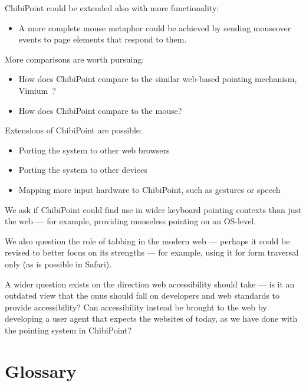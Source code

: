 \documentclass[11pt,openright,a4paper]{report}
\begin{document}
ChibiPoint could be extended also with more functionality:
\begin{itemize}
\item A more complete mouse metaphor could be achieved by sending mouseover events to page elements that respond to them.
\end{itemize}

More comparisons are worth pursuing:
\begin{itemize}
\item How does ChibiPoint compare to the similar web-based pointing mechanism, Vimium~\cite{vimium}?
\item How does ChibiPoint compare to the mouse?
\end{itemize}

Extensions of ChibiPoint are possible:
\begin{itemize}
\item Porting the system to other web browsers
\item Porting the system to other devices
\item Mapping more input hardware to ChibiPoint, such as gestures or speech
\end{itemize}

We ask if ChibiPoint could find use in wider keyboard pointing contexts than just the web --- for example, providing mouseless pointing on an OS-level.

We also question the role of tabbing in the modern web --- perhaps it could be revised to better focus on its strengths --- for example, using it for form traversal only (as is possible in Safari).

A wider question exists on the direction web accessibility should take --- is it an outdated view that the onus should fall on developers and web standards to provide accessibility? Can accessibility instead be brought to the web by developing a user agent that expects the websites of today, as we have done with the pointing system in ChibiPoint?

\pagebreak
\chapter{Glossary}
\printglossary

\clearpage


{}
\printbibliography
\end{document}
